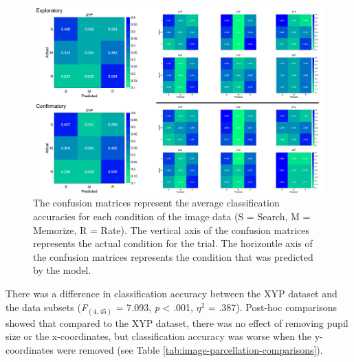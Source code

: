 \documentclass[
  english,
  man,floatsintext]{apa6}
\begin{document}
\begin{figure}
\centering
\includegraphics{figures/img_conf_matrices.pdf}
\caption{\label{fig:img-conf-matrices}The confusion matrices represent the average classification accuracies for each condition of the image data (S = Search, M = Memorize, R = Rate). The vertical axis of the confusion matrices represents the actual condition for the trial. The horizontle axis of the confusion matrices represents the condition that was predicted by the model.}
\end{figure}

There was a difference in classification accuracy between the XYP dataset and the data subsets (\emph{F}\(_{(4, 45)}\) = 7.093, \emph{p} \textless{} .001, \textit{$\eta$}\(^{2}\) = .387). Post-hoc comparisons showed that compared to the XYP dataset, there was no effect of removing pupil size or the x-coordinates, but classification accuracy was worse when the y-coordinates were removed (see Table \ref{tab:image-parcellation-comparisons}).
\end{document}
